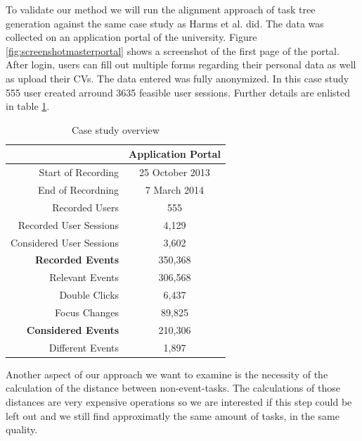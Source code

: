 To validate our method we will run the alignment approach of task tree generation against the same case study as Harms et al. did.
The data was collected on an application portal of the university. Figure \ref{fig:screenshotmasterportal} shows a screenshot of the first page of the portal.
After login, users can fill out multiple forms regarding their personal data as well as upload their CVs. The data entered was fully anonymized. 
In this case study 555 user created arround 3635 feasible user sessions. Further details are enlisted in table \ref{tab:casestudy2}.



\begin{table}
	\centering
	 \begin{tabular}{|r|c|}
		   \hline
		   & \textbf{Application Portal }\\
		     \hline
		       Start of Recording & 25 October 2013 \\
		       End of Recordning & 7 March 2014 \\
		       Recorded Users & 555 \\
		       Recorded User Sessions & 4,129 \\
		       Considered User Sessions & 3,602 \\
		       \hline
		         \textbf{Recorded Events} & 350,368 \\
		         Relevant Events & 306,568 \\
		         Double Clicks & 6,437 \\
		         Focus Changes & 89,825 \\
		         \hline
			   \textbf{Considered Events} & 210,306 \\
			   Different Events & 1,897 \\
			   \hline
			    \end{tabular}
			    \caption{Case study overview}
	\label{tab:casestudy2}
\end{table}



Another aspect of our approach we want to examine is the necessity of the calculation of the distance between non-event-tasks. 
The calculations of those distances are very expensive operations so we are interested if this step could be left out and we still find approximatly the same amount of tasks, in the same quality.


